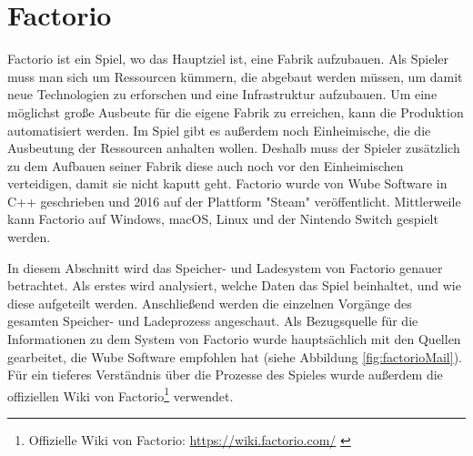 \section{Factorio}
Factorio ist ein Spiel, wo das Hauptziel ist, eine Fabrik aufzubauen. Als Spieler muss man sich um Ressourcen kümmern, die abgebaut werden müssen, um damit neue Technologien zu erforschen und eine Infrastruktur aufzubauen. Um eine möglichst große Ausbeute für die eigene Fabrik zu erreichen, kann die Produktion automatisiert werden. Im Spiel gibt es außerdem noch Einheimische, die die Ausbeutung der Ressourcen anhalten wollen. Deshalb muss der Spieler zusätzlich zu dem Aufbauen seiner Fabrik diese auch noch vor den Einheimischen verteidigen, damit sie nicht kaputt geht. Factorio wurde von Wube Software in C++ geschrieben und 2016 auf der Plattform "Steam" veröffentlicht. Mittlerweile kann Factorio auf Windows, macOS, Linux und der Nintendo Switch gespielt werden.\cite{factorioMain}\cite{factorioPressFactorio}

In diesem Abschnitt wird das Speicher- und Ladesystem von Factorio genauer betrachtet. Als erstes wird analysiert, welche Daten das Spiel beinhaltet, und wie diese aufgeteilt werden. Anschließend werden die einzelnen Vorgänge des gesamten Speicher- und Ladeprozess angeschaut. Als Bezugsquelle für die Informationen zu dem System von Factorio wurde hauptsächlich mit den Quellen gearbeitet, die Wube Software empfohlen hat (siehe Abbildung \ref{fig:factorioMail}). Für ein tieferes Verständnis über die Prozesse des Spieles wurde außerdem die offiziellen Wiki von Factorio\footnote{Offizielle Wiki von Factorio: \url{https://wiki.factorio.com/} \cite{factorioPressFactorio}} verwendet.

